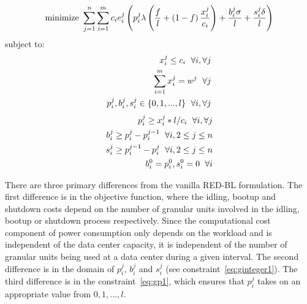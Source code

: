 \begin{align}
\text{minimize } \sum_{j=1}^{n} \sum_{i=1}^{m} c_i e_i^j\left(p_i^j \lambda\left(\frac{f}{l}+\left(1-f\right)\frac{x_i^j}{c_i}\right) + \frac{b_i^j \sigma}{l} + \frac{s_i^j \delta}{l}\right)\notag
\end{align}
subject to:
\begin{align}
x_i^j \le c_i \hspace{6 pt} \forall i, \forall j \label{eq:gcapcon}\\
\sum_{i = 1}^{m} x_i^j = w^j \hspace{6 pt} \forall j \label{eq:gworkcon}\\
p_i^j, b_i^j, s_i^j \in \{0,1,...,l\} \hspace{6 pt} \forall i, \forall j \label{eq:ginteger1}
\end{align}
\begin{align}
p_i^j \ge x_i^j*l/c_i \hspace{6 pt} \forall i, \forall j \label{eq:gp1}\\
b_i^j \ge p_i^j - p_i^{j-1} \hspace{6 pt} \forall i, 2 \le j \le n \label{eq:gbcon}\\
s_i^j \ge p_i^{j-1} - p_i^j \hspace{6 pt} \forall i, 2 \le j \le n \label{eq:gscon}\\
b_i^0 = p_i^0, s_i^0 = 0 \hspace{6 pt} \forall i \label{eq:gbcon1}
\end{align}

There are three primary differences from the vanilla RED-BL formulation. The first difference is in the objective function, where the idling, bootup and shutdown costs depend on the number of granular units involved in the idling, bootup or shutdown process respectively. Since the computational cost component of power consumption only depends on the workload and is independent of the data center capacity, it is independent of the number of granular units being used at a data center during a given interval. The second difference is in the domain of $p_i^j$, $b_i^j$ and $s_i^j$ (see constraint~\ref{eq:ginteger1}). The third difference is in the constraint~\ref{eq:gp1}, which ensures that $p_i^j$ takes on an appropriate value from $0,1,...,l$.

